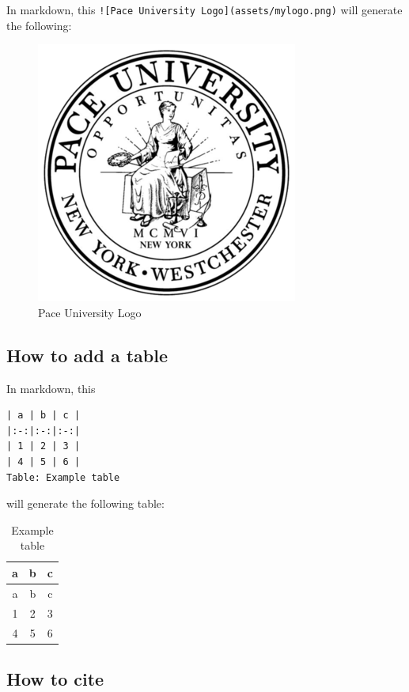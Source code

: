 \documentclass[]{article}
\begin{document}
In markdown, this
\texttt{!{[}Pace\ University\ Logo{]}(assets/mylogo.png)} will generate
the following:



\begin{figure}
\centering
\includegraphics{assets/mylogo.png}
\caption{Pace University Logo}
\end{figure}



\subsection{How to add a table}\label{how-to-add-a-table}

In markdown, this

\begin{verbatim}
| a | b | c |
|:-:|:-:|:-:|
| 1 | 2 | 3 |
| 4 | 5 | 6 |
Table: Example table
\end{verbatim}

will generate the following table:



\begin{longtable}[]{@{}ccc@{}}
\caption{Example table}\tabularnewline
\toprule
a & b & c\tabularnewline
\midrule
\endfirsthead
\toprule
a & b & c\tabularnewline
\midrule
\endhead
1 & 2 & 3\tabularnewline
4 & 5 & 6\tabularnewline
\bottomrule
\end{longtable}



\subsection{How to cite}\label{how-to-cite}
\end{document}
